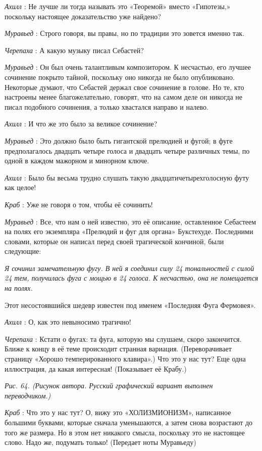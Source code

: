 \documentclass[../main.tex]{subfiles}
\begin{document}
\begin{dialogue}
\emph{Ахилл} : Не лучше ли тогда называть это «Теоремой» вместо «Гипотезы,» поскольку настоящее доказательство уже найдено?

\emph{Муравьед} : Строго говоря, вы правы, но по традиции это зовется именно так.

\emph{Черепаха} : А какую музыку писал Себастей?

\emph{Муравьед} : Он был очень талантливым композитором. К несчастью, его лучшее сочинение покрыто тайной, поскольку оно никогда не было опубликовано. Некоторые думают, что Себастей держал свое сочинение в голове. Но те, кто настроены менее благожелательно, говорят, что на самом деле он никогда не писал подобного сочинения, а только хвастался направо и налево.

\emph{Ахилл} : И что же это было за великое сочинение?

\emph{Муравьед} : Это должно было быть гигантской прелюдией и фугой; в фуге предполагалось двадцать четыре голоса и двадцать четыре различных темы, по одной в каждом мажорном и минорном ключе.

\emph{Ахилл} : Было бы весьма трудно слушать такую двадцатичетырехголосную футу как целое!

\emph{Краб} : Уже не говоря о том, чтобы её сочинить!

\emph{Муравьед} : Все, что нам о ней известно, это её описание, оставленное Себастеем на полях его экземпляра «Прелюдий и фуг для органа» Букстехуде. Последними словами, которые он написал перед своей трагической кончиной, были следующие:

\emph{Я сочинил замечательную фугу. В ней я соединил силу 24 тональностей с силой 24 тем, получилась фуга с мощью в 24 голоса. К несчастью, она не помещается на полях.}

Этот несостоявшийся шедевр известен под именем «Последняя Фуга Фермовея».

\emph{Ахилл} : О, как это невыносимо трагично!

\emph{Черепаха} : Кстати о фугах: та фуга, которую мы слушаем, скоро закончится. Ближе к концу в её теме происходит странная вариация. (Переворачивает страницу «Хорошо темперированного клавира».) Что это у нас тут? Еще одна иллюстрация, да какая интересная! (Показывает её Крабу.)

\emph{Рис. 64. (Рисунок автора. Русский графический вариант выполнен переводчиком.)}

\emph{Краб} : Что это у нас тут? О, вижу это «ХОЛИЗМИОНИЗМ», написанное большими буквами, которые сначала уменьшаются, а затем снова возрастают до того же размера. Но в этом нет никакого смысла, поскольку это не настоящее слово. Надо же, подумать только! (Передает ноты Муравьеду)


\end{dialogue}
\end{document}
